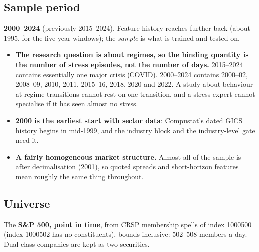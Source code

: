 \subsection{Sample period}

 \textbf{2000--2024} (previously 2015--2024). Feature history reaches further back (about
1995, for the five-year windows); the \emph{sample} is what is trained and tested on.

\begin{whybox}
\begin{itemize}
\item \textbf{The research question is about regimes, so the binding quantity is the number of stress
  episodes, not the number of days.} 2015--2024 contains essentially one major crisis (COVID). 2000--2024
  contains 2000--02, 2008--09, 2010, 2011, 2015--16, 2018, 2020 and 2022. A study about behaviour at
  regime transitions cannot rest on one transition, and a stress expert cannot specialise if it has seen
  almost no stress.
\item \textbf{2000 is the earliest start with sector data}: Compustat's dated GICS history begins in mid-1999,
  and the industry block and the industry-level gate need it.
\item \textbf{A fairly homogeneous market structure.} Almost all of the sample is after decimalisation (2001),
  so quoted spreads and short-horizon features mean roughly the same thing throughout.
\end{itemize}
\end{whybox}

\subsection{Universe}

 The \textbf{S\&P 500, point in time}, from CRSP membership spells of index 1000500
(index 1000502 has no constituents), bounds inclusive: 502--508 members a day. Dual-class companies are
kept as two securities.

